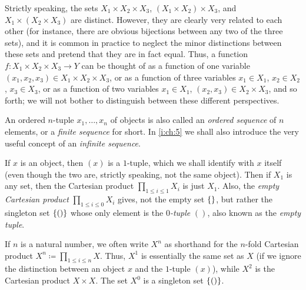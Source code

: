 \begin{note}
  Strictly speaking, the sets \(X_1 \times X_2 \times X_3\), \((X_1 \times X_2) \times X_3\), and \(X_1 \times (X_2 \times X_3)\) are distinct.
  However, they are clearly very related to each other (for instance, there are obvious bijections between any two of the three sets), and it is common in practice to neglect the minor distinctions between these sets and pretend that they are in fact equal.
  Thus, a function \(f : X_1 \times X_2 \times X_3 \to Y\) can be thought of as a function of one variable \((x_1, x_2, x_3) \in X_1 \times X_2 \times X_3\), or as a function of three variables \(x_1 \in X_1\), \(x_2 \in X_2\), \(x_3 \in X_3\), or as a function of two variables \(x_1 \in X_1\), \((x_2, x_3) \in X_2 \times X_3\), and so forth;
  we will not bother to distinguish between these different perspectives.
\end{note}

\setcounter{thm}{9}
\begin{rmk}\label{i:3.5.10}
  An ordered \(n\)-tuple \(x_1, \dots, x_n\) of objects is also called an \emph{ordered sequence} of \(n\) elements, or a \emph{finite sequence} for short.
  In \cref{i:ch:5} we shall also introduce the very useful concept of an \emph{infinite sequence}.
\end{rmk}

\begin{eg}\label{i:3.5.11}
  If \(x\) is an object, then \((x)\) is a \(1\)-tuple, which we shall identify with \(x\) itself (even though the two are, strictly speaking, not the same object).
  Then if \(X_1\) is any set, then the Cartesian product \(\prod_{1 \leq i \leq 1} X_i\) is just \(X_1\).
  Also, the \emph{empty Cartesian product} \(\prod_{1 \leq i \leq 0} X_i\) gives, not the empty set \(\left\lbrace\right\rbrace\), but rather the singleton set \(\left\lbrace()\right\rbrace\) whose only element is the \emph{\(0\)-tuple} \(()\), also known as the \emph{empty tuple}.

  If \(n\) is a natural number, we often write \(X^n\) as shorthand for the \(n\)-fold Cartesian product \(X^n \coloneqq \prod_{1 \leq i \leq n} X\).
  Thus, \(X^1\) is essentially the same set as \(X\) (if we ignore the distinction between an object \(x\) and the \(1\)-tuple \((x)\)), while \(X^2\) is the Cartesian product \(X \times X\).
  The set \(X^0\) is a singleton set \(\left\lbrace()\right\rbrace\).
\end{eg}

